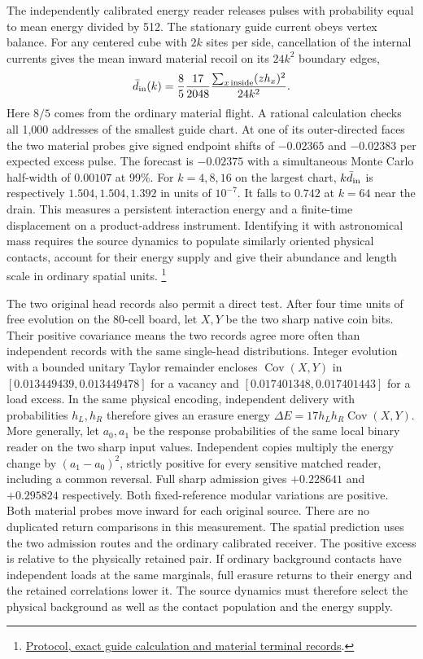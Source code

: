 \documentclass[11pt]{article}
\begin{document}
The independently calibrated energy reader releases pulses with
probability equal to mean energy divided by 512. The stationary guide
current obeys vertex balance. For any centered cube with $2k$ sites per
side, cancellation of the internal currents gives the mean inward
material recoil on its $24k^2$ boundary edges,
\[
 \bar d_{\rm in}(k)=\frac{8}{5}\frac{17}{2048}
    \frac{\sum_{x\,\mathrm{inside}}(zh_x)^2}{24 k^2}.
\]
Here $8/5$ comes from the ordinary material flight. A rational
calculation checks all 1,000 addresses of the smallest guide chart.
At one of its outer-directed faces the two material probes give signed
endpoint shifts of $-0.02365$ and $-0.02383$ per expected excess pulse.
The forecast is $-0.02375$ with a simultaneous Monte Carlo half-width
of $0.00107$ at 99\%. For $k=4,8,16$ on the largest chart,
$k\bar d_{\rm in}$ is respectively $1.504,1.504,1.392$ in units of
$10^{-7}$. It falls to $0.742$ at $k=64$ near the drain. This measures
a persistent interaction energy and a finite-time displacement on a
product-address instrument. Identifying it with astronomical mass
requires the source dynamics to populate similarly oriented physical
contacts, account for their energy supply and give their abundance and
length scale in ordinary spatial units.%
\footnote{\href{https://github.com/FloatingPragma/observer-patch-holography/tree/main/model/experiments/interval_echo_shell_flux/product_address/green_response/material_recoil/overlap_source}{Protocol, exact guide calculation and material terminal records}.}


The two original head records also permit a direct test. After four
time units of free evolution on the 80-cell board, let $X,Y$ be the
two sharp native coin bits. Their positive covariance means the two
records agree more often than independent records with the same
single-head distributions. Integer evolution with a bounded unitary
Taylor remainder encloses $\operatorname{Cov}(X,Y)$ in
$[0.013449439,0.013449478]$ for a vacancy and
$[0.017401348,0.017401443]$ for a load excess. In the same physical
encoding, independent delivery with probabilities $h_L,h_R$
therefore gives an erasure energy
$\Delta E=17h_Lh_R\operatorname{Cov}(X,Y)$. More generally, let
$a_0,a_1$ be the response probabilities of the same local binary
reader on the two sharp input values. Independent copies multiply the
energy change by $(a_1-a_0)^2$, strictly positive for every sensitive
matched reader, including a common reversal. Full sharp admission gives
$+0.228641$ and $+0.295824$ respectively. Both fixed-reference
modular variations are positive. Both material probes move inward for
each original source. There are no duplicated return comparisons in
this measurement. The spatial prediction uses the two admission
routes and the ordinary calibrated receiver. The positive excess is
relative to the physically retained pair. If ordinary background
contacts have independent loads at the same marginals, full
erasure returns to their energy and the retained correlations lower
it. The source dynamics must therefore select the physical background
as well as the contact population and the energy supply.
\end{document}
